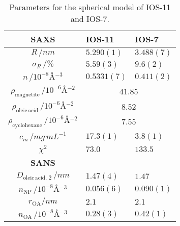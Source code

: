 \documentclass[\main/dresen_thesis.tex]{subfiles}
\begin{document}
    \begin{table}[!htbp]
      \centering
      \caption{\label{tab:looselyPackedNP:nanoparticle:sas}Parameters for the spherical model of IOS-11 and IOS-7.}
      \begin{tabular}{ c | l | l }
        \rule{0pt}{2ex} \textbf{SAXS}  & \textbf{IOS-11} & \textbf{IOS-7} \\
        \hline
        \rule{0pt}{2ex} $R \, / \unit{nm}$                                                  & $5.290(1)$           & $3.488(7)$\\
        \rule{0pt}{2ex} $\sigma_{R}\, / \unit{\%}$                                          & $5.59(3)$            & $9.6(2)$ \\
        \rule{0pt}{2ex} $n \, / \unit{10^{-8} \angstrom^{-3}}$                              & $0.5331(7)$          & $0.411(2)$\\
        \hline
        \rule{0pt}{2ex} $\rho_\mathrm{magnetite} \, / \unit{10^{-6} \angstrom^{-2}}$        & \multicolumn{2}{c}{$41.85$}\\
        \rule{0pt}{2ex} $\rho_\mathrm{oleic\, acid} \, / \unit{10^{-6} \angstrom^{-2}}$     & \multicolumn{2}{c}{$8.52$}\\
        \rule{0pt}{2ex} $\rho_\mathrm{cyclohexane} \, / \unit{10^{-6} \angstrom^{-2}}$      & \multicolumn{2}{c}{$7.55$}\\
        \hline
        \rule{0pt}{2ex} $c_m \, / \unit{mg\, mL^{-1}}$                                      & $17.3(1)$            & $3.8(1)$\\
        \hline
        \rule{0pt}{2ex} $\chi^2$                                                            & $73.0$               & $133.5$\\
        \hline
        \hline
        \rule{0pt}{2ex} \textbf{SANS} \\
        \hline
        \rule{0pt}{2ex} $D_{\mathrm{oleic \, acid}, \, 2}\, / \unit{nm}$                    & $1.47(4)$            & $1.47$    \\
        \rule{0pt}{2ex} $n_\mathrm{NP} \, / \unit{10^{-8} \angstrom^{-3}}$                  & $0.056(6)$           & $0.090(1)$\\
        \rule{0pt}{2ex} $r_\mathrm{OA} / \unit{nm}$                                         & $2.1$                & $2.1$ \\
        \rule{0pt}{2ex} $n_\mathrm{OA} \, / \unit{10^{-8} \angstrom^{-3}}$                  & $0.28(3)$            & $0.42(1)$  \\
        \hline

\end{tabular}
\end{table}
\end{document}
